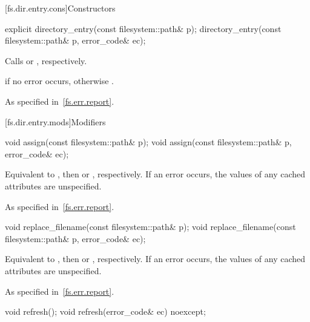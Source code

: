 [fs.dir.entry.cons]{Constructors}

%
\begin{itemdecl}
explicit directory_entry(const filesystem::path& p);
directory_entry(const filesystem::path& p, error_code& ec);
\end{itemdecl}

\begin{itemdescr}
\pnum
\effects
Calls  or , respectively.

\pnum
\ensures
{} if no error occurs,
otherwise .

\pnum
\throws
As specified in~\ref{fs.err.report}.
\end{itemdescr}

[fs.dir.entry.mods]{Modifiers}

%
\begin{itemdecl}
void assign(const filesystem::path& p);
void assign(const filesystem::path& p, error_code& ec);
\end{itemdecl}

\begin{itemdescr}
\pnum
\effects
Equivalent to ,
then  or , respectively.
If an error occurs, the values of any cached attributes are unspecified.

\pnum
\throws
As specified in~\ref{fs.err.report}.
\end{itemdescr}

%
\begin{itemdecl}
void replace_filename(const filesystem::path& p);
void replace_filename(const filesystem::path& p, error_code& ec);
\end{itemdecl}

\begin{itemdescr}
\pnum
\effects
Equivalent to ,
then  or , respectively.
If an error occurs, the values of any cached attributes are unspecified.

\throws
As specified in~\ref{fs.err.report}.
\end{itemdescr}

%
\begin{itemdecl}
void refresh();
void refresh(error_code& ec) noexcept;
\end{itemdecl}

